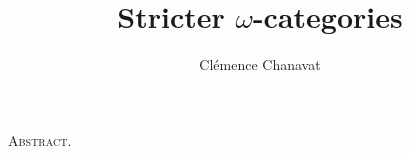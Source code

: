 \documentclass[11pt,twoside]{article}
\title{Stricter $\omega$-categories}
\author{Cl\'emence Chanavat}
\begin{document}
\maketitle
\begin{center}
	\begin{minipage}[t]{.95\textwidth}
		\small\textsc{Abstract.}

	\end{minipage}
	
	\vspace{20pt}

	\begin{minipage}[t]{0.95\textwidth}
		\setcounter{tocdepth}{2}
		\tableofcontents
	\end{minipage}
\end{center}

\makeaftertitle








\small
\end{document}
